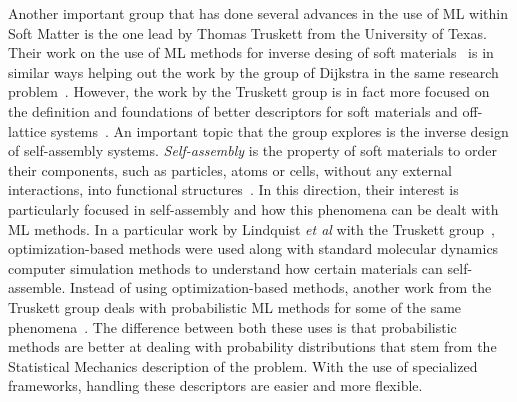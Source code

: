 Another important group that has done several advances in the use of ML within Soft Matter
is the one lead by Thomas Truskett from the University of Texas.
Their work on the use of ML methods for inverse desing of soft materials~\cite{shermanInverseMethodsDesign2020a}
is in similar ways helping out the work by the group of Dijkstra in the same research
problem~\cite{APSAPSMarcha}.
However, the work by the Truskett group is in fact more focused on the definition and
foundations of better descriptors for soft materials and off-lattice systems~\cite{jadrichUnsupervisedMachineLearning2018}.
An important topic that the group explores is the inverse design of self-assembly
systems. \emph{Self-assembly} is the property of soft materials to order their
components, such as particles, atoms or cells, without any external interactions,
into functional structures~\cite{grzybowskiSelfassemblyCrystalsCells2009}.
In this direction, their interest is particularly focused in self-assembly and how this 
phenomena can be dealt with ML methods.
In a particular work by Lindquist \emph{et al} with the Truskett group~\cite{lindquistCommunicationInverseDesign2016},
optimization-based methods were used along with standard molecular dynamics computer
simulation methods to understand how certain materials can self-assemble.
Instead of using optimization-based methods, another work from the Truskett group
deals with probabilistic ML methods for some of the same phenomena~\cite{jadrichProbabilisticInverseDesign2017}.
The difference between both these uses is that probabilistic methods are better at dealing
with probability distributions that stem from the Statistical Mechanics description of the
problem. With the use of specialized frameworks, handling these descriptors are easier
and more flexible.

